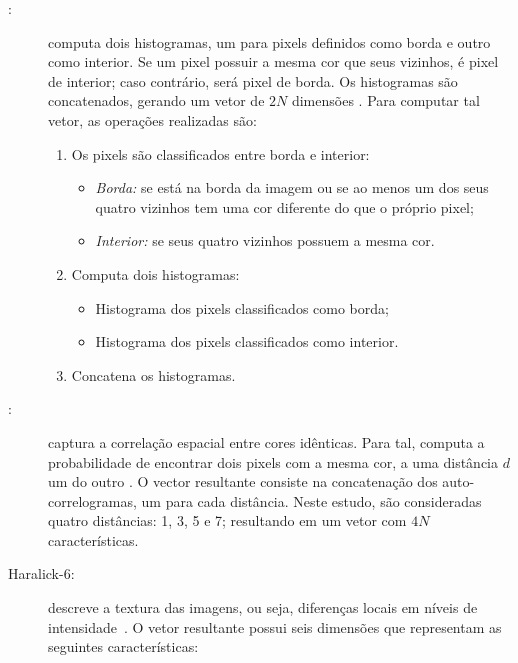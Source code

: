 \begin{description}
\item[:] computa dois histogramas, um para pixels definidos como borda e outro como interior. Se um pixel possuir a mesma cor que seus vizinhos, é pixel de interior; caso contrário, será pixel de borda. Os histogramas são concatenados, gerando um vetor de $2N$ dimensões \cite{bic}. Para computar tal vetor, as operações realizadas são:

\begin{enumerate}
  \item Os pixels são classificados entre borda e interior:
  \begin{itemize}
    \item \emph{Borda:} se está na borda da imagem ou se ao menos um dos seus quatro vizinhos tem uma cor diferente do que o próprio pixel;
    \item \emph{Interior:} se seus quatro vizinhos possuem a mesma cor.
  \end{itemize}
  \item Computa dois histogramas:
  \begin{itemize}
    \item Histograma dos pixels classificados como borda;
    \item Histograma dos pixels classificados como interior.
  \end{itemize}
  \item Concatena os histogramas.
\end{enumerate}

\item[:] captura a correlação espacial entre cores idênticas. Para tal, computa a probabilidade de encontrar dois pixels com a mesma cor, a uma distância $d$ um do outro \cite{acc}. O vector resultante consiste na concatenação dos auto-correlogramas, um para cada distância. Neste estudo, são consideradas quatro distâncias: 1, 3, 5 e 7; resultando em um vetor com $4N$ características.

\item[Haralick-6:] descreve a textura das imagens, ou seja, diferenças locais em níveis de intensidade~\cite{Haralick1973}. O vetor resultante possui seis dimensões que representam as seguintes características:


\end{description}
